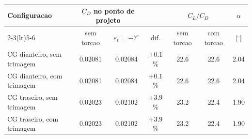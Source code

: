 \begin{tabular}{lcccccc}
\toprule
Configuracao & \multicolumn{2}{c}{$C_D$ no ponto de projeto} & & \multicolumn{2}{c}{$C_L/C_D$} & $\alpha$ \\
\cmidrule(lr){2-3}\cmidrule(lr){5-6}
& sem torcao & $\varepsilon_t=-7^\circ$ & dif. & sem torcao & com torcao & [$^\circ$] \\
\midrule
CG dianteiro, sem trimagem & 0.02081 & 0.02084 & $+0.1$\% & 22.6 & 22.6 & 2.04 \\
CG dianteiro, com trimagem & 0.02081 & 0.02084 & $+0.1$\% & 22.6 & 22.6 & 2.04 \\
CG traseiro, sem trimagem & 0.02023 & 0.02102 & $+3.9$\% & 23.2 & 22.4 & 1.90 \\
CG traseiro, com trimagem & 0.02023 & 0.02102 & $+3.9$\% & 23.2 & 22.4 & 1.90 \\
\bottomrule
\end{tabular}
